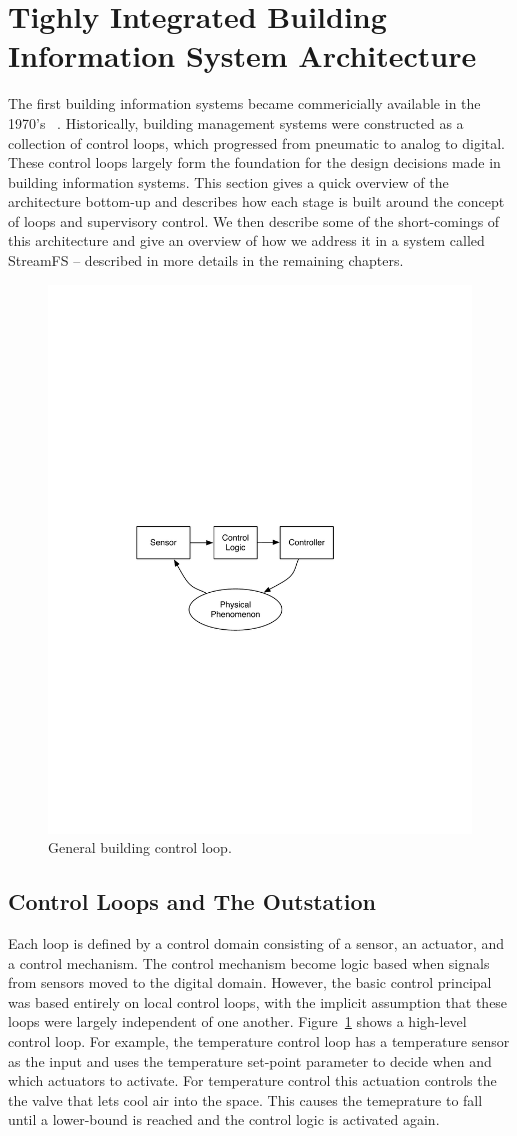 \section{Tighly Integrated Building Information System Architecture}

The first building information systems became commericially available in the 1970's ~\cite{gardner1987energy}.  
Historically, building management 
systems were constructed as a collection of control loops, which progressed from pneumatic to analog to digital.
These control loops largely form the foundation for the design decisions made in building information systems.  
This section gives a quick overview of the architecture bottom-up and describes how each stage is built around
the concept of loops and supervisory control.  We then describe some of the short-comings of this architecture
and give an overview of how we address it in a system called StreamFS -- described in more details in
the remaining chapters.

\begin{figure}[t!] %
\centering
\includegraphics[width=0.50\columnwidth]{figs/control_loop}
\caption{General building control loop.}
\label{fig:control_loop}
\end{figure}

\subsection{Control Loops and The Outstation}
\label{sec:control_loops}
Each loop is defined by a control domain consisting of a sensor, an actuator, and a control mechanism.  The control mechanism
become logic based when signals from sensors moved to the digital domain.  However, the basic control principal was based
entirely on local control loops, with the implicit assumption that these loops were largely independent of one another.
Figure~\ref{fig:control_loop} shows a high-level control loop.  For example, the temperature control loop has a temperature
sensor as the input and uses the temperature set-point parameter to decide when and which actuators to activate.
For temperature control this actuation controls the the valve that lets cool air into the space.  This causes the temeprature
to fall until a lower-bound is reached and the control logic is activated again.

